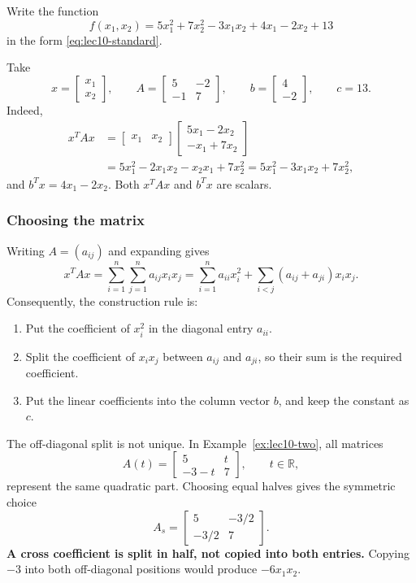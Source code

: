 \begin{example}\label{ex:lec10-two}
	Write the function
	\[
		f(x_1,x_2)=5x_1^2+7x_2^2-3x_1x_2+4x_1-2x_2+13
	\]
	in the form \eqref{eq:lec10-standard}.
\end{example}
Take
\[
	x=\begin{bmatrix}x_1\\x_2\end{bmatrix},\qquad
	A=\begin{bmatrix}5&-2\\-1&7\end{bmatrix},\qquad
	b=\begin{bmatrix}4\\-2\end{bmatrix},\qquad c=13.
\]
Indeed,
\begin{align*}
	x^TAx & =\begin{bmatrix}x_1&x_2\end{bmatrix}
	\begin{bmatrix}5x_1-2x_2\\-x_1+7x_2\end{bmatrix} \\
	      & =5x_1^2-2x_1x_2-x_2x_1+7x_2^2
	=5x_1^2-3x_1x_2+7x_2^2,
\end{align*}
and $b^Tx=4x_1-2x_2$. Both $x^TAx$ and $b^Tx$ are scalars.

\clearpage
\subsubsection*{Choosing the matrix}
Writing $A=(a_{ij})$ and expanding gives
\begin{equation}\label{eq:lec10-expansion}
	x^TAx=\sum_{i=1}^n\sum_{j=1}^n a_{ij}x_ix_j
	=\sum_{i=1}^n a_{ii}x_i^2+\sum_{i<j}(a_{ij}+a_{ji})x_ix_j.
\end{equation}
Consequently, the construction rule is:
\begin{enumerate}
	\item Put the coefficient of $x_i^2$ in the diagonal entry $a_{ii}$.
	\item Split the coefficient of $x_ix_j$ between $a_{ij}$ and $a_{ji}$, so their sum is the required coefficient.
	\item Put the linear coefficients into the column vector $b$, and keep the constant as $c$.
\end{enumerate}
The off-diagonal split is not unique. In Example~\ref{ex:lec10-two}, all matrices
\[
	A(t)=\begin{bmatrix}5&t\\-3-t&7\end{bmatrix},\qquad t\in\mathbb R,
\]
represent the same quadratic part. Choosing equal halves gives the symmetric choice
\[
	A_s=\begin{bmatrix}5&-3/2\\-3/2&7\end{bmatrix}.
\]
\textbf{A cross coefficient is split in half, not copied into both entries.} Copying $-3$ into both off-diagonal positions would produce $-6x_1x_2$.


